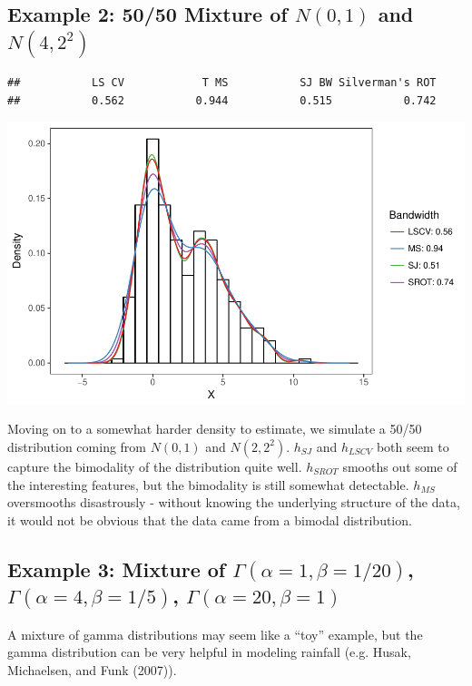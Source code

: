 \documentclass[]{article}
\begin{document}
\newpage

\subsection{Example 2: 50/50 Mixture of $N(0, 1)$ and $N(4, 2^2)$}

\begin{verbatim}
##           LS CV            T MS           SJ BW Silverman's ROT 
##           0.562           0.944           0.515           0.742
\end{verbatim}

\begin{center}\includegraphics{FinalReport_files/figure-latex/unnamed-chunk-7-1} \end{center}

Moving on to a somewhat harder density to estimate, we simulate a 50/50
distribution coming from \(N(0,1)\) and \(N(2, 2^2)\). \(h_{SJ}\) and
\(h_{LSCV}\) both seem to capture the bimodality of the distribution
quite well. \(h_{SROT}\) smooths out some of the interesting features,
but the bimodality is still somewhat detectable. \(h_{MS}\) oversmooths
disastrously - without knowing the underlying structure of the data, it
would not be obvious that the data came from a bimodal distribution.

\newpage

\subsection{Example 3: Mixture of $\Gamma(\alpha = 1, \beta = 1/20)$, $\Gamma(\alpha = 4, \beta = 1/5)$, $\Gamma(\alpha = 20, \beta = 1)$}

A mixture of gamma distributions may seem like a ``toy'' example, but
the gamma distribution can be very helpful in modeling rainfall (e.g.
Husak, Michaelsen, and Funk (2007)).
\end{document}
